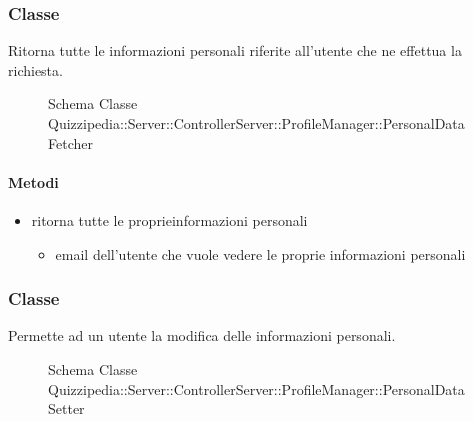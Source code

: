 \subsubsection{Classe }
Ritorna tutte le informazioni personali riferite all'utente che ne effettua la richiesta.
\begin{figure}[H]
\centering
\noindent{}
\caption[Schema Classe PersonalDataFetcher]{Schema Classe Quizzipedia::Server::ControllerServer::ProfileManager::PersonalDataFetcher}
\end{figure}
\paragraph{Metodi}
\begin{itemize}
\item {}
\newline
ritorna tutte le proprieinformazioni personali
\newline
{}
\newline
\begin{itemize}
\item {}
\newline
email dell'utente che vuole vedere le proprie informazioni personali
\end{itemize}
\end{itemize}
\subsubsection{Classe }
Permette ad un utente la modifica delle informazioni personali.
\begin{figure}[H]
\centering
\noindent{}
\caption[Schema Classe PersonalDataSetter]{Schema Classe Quizzipedia::Server::ControllerServer::ProfileManager::PersonalDataSetter}
\end{figure}
